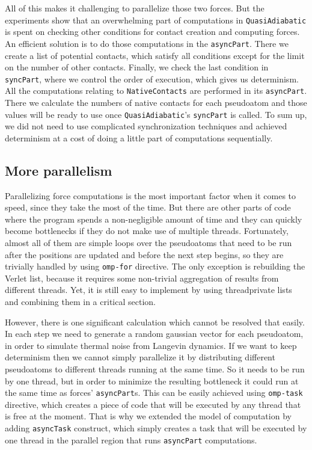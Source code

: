 All of this makes it challenging to parallelize those two forces. But the experiments show that an overwhelming part of computations in \texttt{QuasiAdiabatic} is spent on checking other conditions for contact creation and computing forces. An efficient solution is to do those computations in the \texttt{asyncPart}. There we create a list of potential contacts, which satisfy all conditions except for the limit on the number of other contacts. Finally, we check the last condition in \texttt{syncPart}, where we control the order of execution, which gives us determinism. All the computations relating to \texttt{NativeContacts} are performed in its \texttt{asyncPart}. There we calculate the numbers of native contacts for each pseudoatom and those values will be ready to use once \texttt{QuasiAdiabatic}'s \texttt{syncPart} is called. 
To sum up, we did not need to use complicated synchronization techniques and achieved determinism at a cost of doing a little part of computations sequentially.   

\subsection{More parallelism}\label{new:more_parallelism}
Parallelizing force computations is the most important factor when it comes to speed, since they take the most of the time. But there are other parts of code where the program spends a non-negligible amount of time and they can quickly become bottlenecks if they do not make use of multiple threads. Fortunately, almost all of them are simple loops over the pseudoatoms that need to be run after the positions are updated and before the next step begins, so they are trivially handled by using \texttt{omp-for} directive. The only exception is rebuilding the Verlet list, because it requires some non-trivial aggregation of results from different threads. Yet, it is still easy to implement by using threadprivate lists and combining them in a critical section.

However, there is one significant calculation which cannot be resolved that easily. In each step we need to generate a random gaussian vector for each pseudoatom, in order to simulate thermal noise from Langevin dynamics. If we want to keep determinism then we cannot simply parallelize it by distributing different pseudoatoms to different threads running at the same time. So it needs to be run by one thread, but in order to minimize the resulting bottleneck it could run at the same time as forces' \texttt{asyncPart}s. This can be easily achieved using \texttt{omp-task} directive, which creates a piece of code that will be executed by any thread that is free at the moment. That is why we extended the model of computation by adding \texttt{asyncTask} construct, which simply creates a task that will be executed by one thread in the parallel region that runs \texttt{asyncPart} computations.

